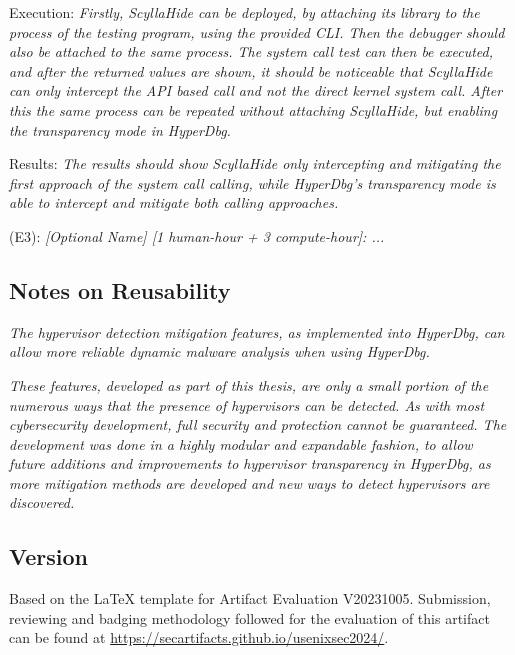 \begin{compactdesc}
\begin{asparadesc}
        \item[Execution:]  \textit{Firstly, ScyllaHide can be deployed, by attaching its library to the process of the testing program, using the provided CLI. Then the debugger should also be attached to the same 
        process. The system call test can then be executed, and after the returned values are shown, it should be noticeable  that ScyllaHide can only intercept the API based call and not the direct kernel system call.
        After this the same process can be repeated without attaching ScyllaHide, but enabling the transparency mode in HyperDbg.}
        
        \item[Results:] \textit{The results should show ScyllaHide only intercepting and mitigating the first approach of the system call calling, while HyperDbg's transparency mode is able to intercept and mitigate both
        calling approaches.}
    \end{asparadesc}

    \item[(E3):] \textit{[Optional Name] [1 human-hour + 3 compute-hour]: ...}

\end{compactdesc}

\subsection{Notes on Reusability}
\label{sec:reuse}

\textit{The hypervisor detection mitigation features, as implemented into HyperDbg, can allow more reliable dynamic malware analysis when using HyperDbg.}

\textit{These features, developed as part of this thesis, are only a small portion
of the numerous ways that the presence of hypervisors can be detected. As with most cybersecurity development, 
full security and protection cannot be guaranteed. The development was done in a highly modular and expandable fashion, 
to allow future additions and improvements to hypervisor transparency in HyperDbg, as more mitigation methods are developed and new ways to detect hypervisors are discovered.}


\subsection{Version}
Based on the LaTeX template for Artifact Evaluation V20231005. Submission,
reviewing and badging methodology followed for the evaluation of this artifact
can be found at \url{https://secartifacts.github.io/usenixsec2024/}.